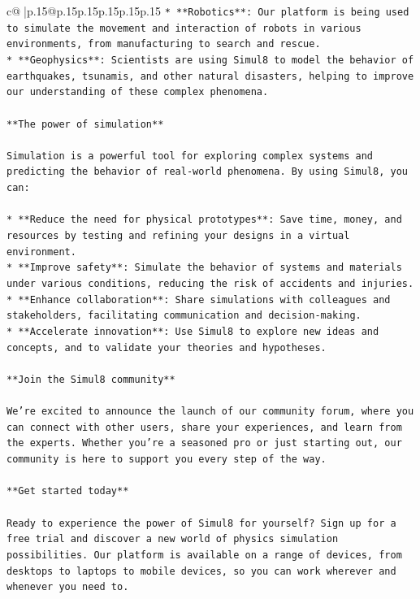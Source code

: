 \documentclass{article}
\begin{document}
{\begin{supertabular}{c@{$\;$}|p{.15\linewidth}@{}p{.15\linewidth}p{.15\linewidth}p{.15\linewidth}p{.15\linewidth}p{.15\linewidth}}
{{{\texttt{* **Robotics**: Our platform is being used to simulate the movement and interaction of robots in various environments, from manufacturing to search and rescue.} \\
\texttt{* **Geophysics**: Scientists are using Simul8 to model the behavior of earthquakes, tsunamis, and other natural disasters, helping to improve our understanding of these complex phenomena.} \\
\\ 
\texttt{**The power of simulation**} \\
\\ 
\texttt{Simulation is a powerful tool for exploring complex systems and predicting the behavior of real{-}world phenomena. By using Simul8, you can:} \\
\\ 
\texttt{* **Reduce the need for physical prototypes**: Save time, money, and resources by testing and refining your designs in a virtual environment.} \\
\texttt{* **Improve safety**: Simulate the behavior of systems and materials under various conditions, reducing the risk of accidents and injuries.} \\
\texttt{* **Enhance collaboration**: Share simulations with colleagues and stakeholders, facilitating communication and decision{-}making.} \\
\texttt{* **Accelerate innovation**: Use Simul8 to explore new ideas and concepts, and to validate your theories and hypotheses.} \\
\\ 
\texttt{**Join the Simul8 community**} \\
\\ 
\texttt{We're excited to announce the launch of our community forum, where you can connect with other users, share your experiences, and learn from the experts. Whether you're a seasoned pro or just starting out, our community is here to support you every step of the way.} \\
\\ 
\texttt{**Get started today**} \\
\\ 
\texttt{Ready to experience the power of Simul8 for yourself? Sign up for a free trial and discover a new world of physics simulation possibilities. Our platform is available on a range of devices, from desktops to laptops to mobile devices, so you can work wherever and whenever you need to.} \\
\\ 
}}}
\end{supertabular}}
\end{document}
